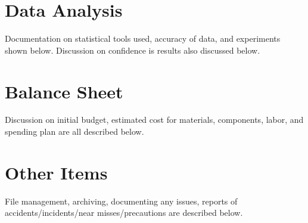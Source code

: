 \documentclass[12pt]{article}
\begin{document}
		\newpage	
	
	\section{Data Analysis}
	Documentation on statistical tools used, accuracy of data, and experiments shown below. Discussion on confidence is results also discussed below.
		
		\newpage
	
	\section{Balance Sheet}
	Discussion on initial budget, estimated cost for materials, components, labor, and spending plan are all described below.
		
		\newpage				
						
	\section{Other Items}
	File management, archiving, documenting any issues, reports of accidents/incidents/near misses/precautions are described below.
\end{document}

